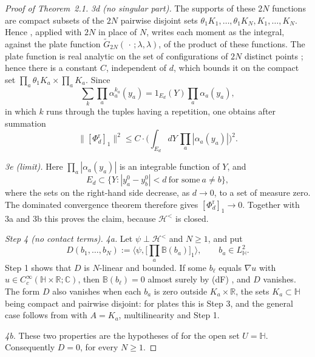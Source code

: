 \documentclass[11pt,letterpaper,reqno]{amsart}
\theoremstyle{definition}
\begin{document}
\begin{proof}[Proof of Theorem~2.1]
\emph{3d (no singular part).} The supports of these $2N$ functions are compact subsets of the $2N$ pairwise disjoint sets $\theta_1K_1,\dots,\theta_1K_N,K_1,\dots,K_N$.
Hence \cite[Proposition~14.44]{QEDII}, applied with $2N$ in place of $N$, writes each moment as the integral, against the plate function $\tilde G_{2N}(\,\cdot\,;\lambda,\lambda)$, of the product of these functions.
The plate function is real analytic on the set of configurations of $2N$ distinct points \cite[Lemma~14.35\,(e)]{QEDII}; hence there is a constant $C$, independent of $d$, which bounds it on the compact set $\prod_a\theta_1K_a\times\prod_aK_a$.
Since
\begin{equation*}
\sum_k\prod_a\alpha_a^{k_a}(y_a)=1_{E_d}(Y)\prod_a\alpha_a(y_a),
\end{equation*}
in which $k$ runs through the tuples having a repetition, one obtains after summation
\begin{equation*}
\|[\Phi^{\mathrm r}_d]_1\|^2\le C\cdot\Big(\int_{E_d}dY\,\prod_a|\alpha_a(y_a)|\Big)^2.
\end{equation*}

\emph{3e (limit).} Here $\prod_a|\alpha_a(y_a)|$ is an integrable function of $Y$, and
\begin{equation*}
E_d\subset\{Y:|y_a^0-y_b^0|<d\ \text{for some}\ a\ne b\},
\end{equation*}
where the sets on the right-hand side decrease, as $d\to0$, to a set of measure zero.
The dominated convergence theorem therefore gives $[\Phi^{\mathrm r}_d]_1\to0$.
Together with 3a and 3b this proves the claim, because $\mathcal H^{<}$ is closed.

\emph{Step 4 (no contact terms).}
\emph{4a.} Let $\psi\perp\mathcal H^{<}$ and $N\ge1$, and put
\begin{equation*}
D(b_1,\dots,b_N):=\Big\langle\psi,\Big[\prod_a\mathbb B(b_a)\Big]_1\Big\rangle,\qquad b_a\in L^2_{\mathbb H}.
\end{equation*}
Step 1 shows that $D$ is $N$-linear and bounded.
If some $b_\ell$ equals $\nabla u$ with $u\in C_c^\infty(\mathbb H\times\mathbb R;\mathbb C)$, then $\mathbb B(b_\ell)=0$ almost surely by (dF) \cite[Definition~14.2\,(a)]{QEDII}, and $D$ vanishes.
The form $D$ also vanishes when each $b_a$ is zero outside $K_a\times\mathbb R$, the sets $K_a\subset\mathbb H$ being compact and pairwise disjoint: for plates this is Step 3, and the general case follows from \cite[Lemma~14.8\,(a)]{QEDII} with $A=K_a$, multilinearity and Step 1.

\emph{4b.} These two properties are the hypotheses of \cite[Proposition~14.13]{QEDII} for the open set $U=\mathbb H$.
Consequently $D=0$, for every $N\ge1$.


\end{proof}
\end{document}
